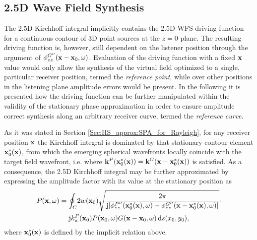 \subsection{2.5D Wave Field Synthesis}

The 2.5D Kirchhoff integral implicitly contains the 2.5D WFS driving function for a continuous contour of 3D point sources at the $z = 0$ plane.
The resulting driving function is, however, still dependent on the listener position through the argument of $\phi^{G''}_{zz}(\mathbf{x}-\mathbf{x}_0,\omega)$. 
Evaluation of the driving function with a fixed $\mathbf{x}$ value would only allow the synthesis of the virtual field optimized to a single, particular receiver position, termed the \emph{reference point}, while over other positions in the listening plane amplitude errors would be present.
In the following it is presented how the driving function can be further manipulated within the validity of the stationary phase approximation in order to ensure amplitude correct synthesis along an arbitrary receiver curve, termed the \emph{reference curve}.  

As it was stated in Section \ref{Sec:HS_approx:SPA_for_Rayleigh}, for any receiver position $\mathbf{x}$ the Kirchhoff integral is dominated by that stationary contour element $\mathbf{x}_0^*(\mathbf{x})$, from which the emerging spherical wavefronts locally coincide with the target field wavefront, i.e. where $\mathbf{k}^P(\mathbf{x}_0^*(\mathbf{x})) = \mathbf{k}^G(\mathbf{x} - \mathbf{x}_0^*(\mathbf{x}))$ is satisfied.
As a consequence, the 2.5D Kirchhoff integral may be further approximated by expressing the amplitude factor with its value at the stationary position as
\begin{multline}
P(\mathbf{x},\omega) = 
\oint_{C}
\! 2 w(\mathbf{x}_0) 
\sqrt{\frac{2 \pi}{\mathrm{j} |\phi^{P''}_{zz}(\mathbf{x}_0^*(\mathbf{x}),\omega) + \phi^{G''}_{zz}(\mathbf{x}-\mathbf{x}_0^*(\mathbf{x}),\omega)|}}
\cdot \\
\mathrm{j} k_{\mathrm{n}}^P(\mathbf{x}_0) 	P(\mathbf{x}_0,\omega)
G(\mathbf{x}-\mathbf{x}_0,\omega) \, \mathrm{d} s(x_0,y_0),
\label{Eq:SFS_theory:25D_KI_appr}
\end{multline}
where $\mathbf{x}_0^*(\mathbf{x})$ is defined by the implicit relation above.

